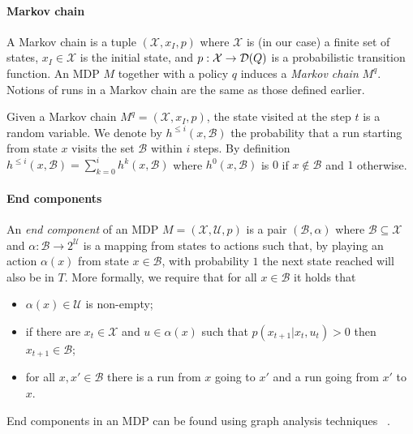 \paragraph*{Markov chain}
A Markov chain is a tuple $(\mathcal{X},x_I,p)$ where $\mathcal{X}$ is (in our case) a finite set of states, $x_I \in \mathcal{X}$ is the initial state, and $p: \mathcal{X} \to \mathcal{D}(Q)$ is a probabilistic transition function. An MDP $M$ together with a policy $q$ induces a \emph{Markov chain} $M^q$.  Notions of runs in a Markov chain are the same as those defined earlier. 

Given a Markov chain $M^q = (\mathcal{X},x_I,p)$, the state visited at the step $t$ is
a random variable. We denote by $h^{\leq i}(x,\mathcal{B})$ the probability that a
run starting from state $x$ visits the set $\mathcal{B}$ within $i$ steps. By definition
$h^{\leq i}(x,\mathcal{B}) = \sum_{k=0}^{i} h^{k}(x,\mathcal{B})$ where $h^0(x,\mathcal{B})$ is $0$ if $x
\not\in \mathcal{B}$ and $1$ otherwise. %


\paragraph*{End components}
An \textit{end component} of an MDP $M=(\mathcal{X},\mathcal{U},p)$
is a pair $(\mathcal{B},\alpha)$ where $\mathcal{B} \subseteq \mathcal{X}$ and 
$\alpha : \mathcal{B} \to 2^{\mathcal{U}}$ is a mapping from states to actions such that, by
playing an action $\alpha(x)$ from state $x \in \mathcal{B}$, with probability $1$ the
next state reached will also be in $T$. More formally, we require that
for all $x \in \mathcal{B}$ it holds that
\begin{itemize}
	\item $\alpha(x) \in \mathcal{U}$ is non-empty;
	\item if there are $x_t \in \mathcal{X}$ and $u \in \alpha(x)$ such that
		$p(x_{t+1} \vert x_t,u_t ) >0$ then $x_{t+1} \in \mathcal{B}$;
	\item for all $x,x' \in \mathcal{B}$ there is a run from $x$ going to $x'$ and a run going from $x'$ to $x$.
\end{itemize}
End components in an MDP can be found using graph analysis techniques ~\cite{BaierKatoen08}.